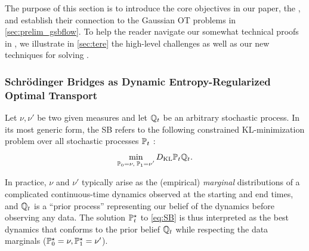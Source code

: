 The purpose of this section is to introduce the core objectives in our paper, the , and establish their connection to the Gaussian \acrshort{OT} problems in \cref{sec:prelim_gsbflow}. To help the reader navigate our somewhat technical proofs in ,  we illustrate in \cref{sec:tere} the high-level challenges as well as our new techniques for solving .

\subsubsection{Schr\"odinger Bridges as Dynamic Entropy-Regularized Optimal Transport}


Let $\nu, \nu'$ be two given measures and let $\refpro$ be an arbitrary stochastic process. In its most generic form, the \acrlong{SB} refers to the following constrained KL-minimization problem over all stochastic processes $\Pmargin$ \citep{leonard2013survey, chen2021stochastic}: 
\begin{equation}
\label{eq:SB}
\min_{ \substack{ \Pinit = \nu, \; \Pend = \nu'} } \KL{\Pmargin}{\refpro}.%
\end{equation}


In practice, $\nu$ and $\nu'$ typically arise as the (empirical) \emph{marginal} distributions of a complicated continuous-time dynamics observed at the starting and end times, and $\refpro$ is a ``prior process'' representing our belief of the dynamics before observing any data. The solution $\Pstar$ to \eqref{eq:SB} is thus interpreted as the best dynamics that conforms to the prior belief $\refpro$ while respecting the data marginals ($\Pstar[0] = \nu, \Pstar[\horizon] = \nu'$). 


